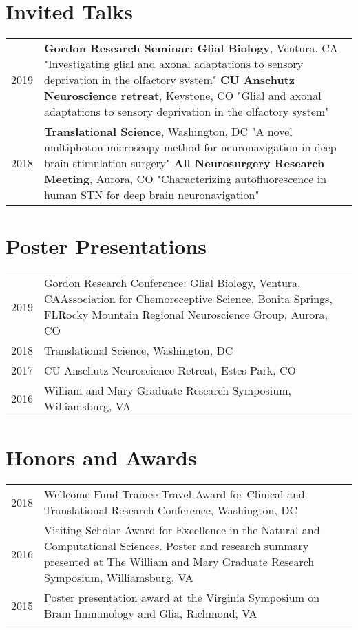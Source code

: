\documentclass[11pt]{article}
\begin{document}
\section*{Invited Talks}
\label{sec:org18bde68}
\begin{tabular}{lp{}}

2019& \textbf{Gordon Research Seminar: Glial Biology}, Ventura, CA \newline "Investigating glial and axonal adaptations to sensory deprivation in the olfactory system"\newline
\textbf{CU Anschutz Neuroscience retreat}, Keystone, CO \newline "Glial and axonal adaptations to sensory deprivation in the olfactory system" \\
2018& \textbf{Translational Science}, Washington, DC \newline "A novel multiphoton microscopy method for neuronavigation in deep brain stimulation surgery"
 \newline \textbf{All Neurosurgery Research Meeting}, Aurora, CO \newline "Characterizing autofluorescence in human STN for deep brain neuronavigation"\\
\end{tabular}
\section*{Poster Presentations}
\label{sec:org87837cd}
\begin{tabular}{lp{}}
2019& Gordon Research Conference: Glial Biology, Ventura, CA\newline Association for Chemoreceptive Science, Bonita Springs, FL\newline Rocky Mountain Regional Neuroscience Group, Aurora, CO\\
2018& Translational Science, Washington, DC\\
2017& CU Anschutz Neuroscience Retreat, Estes Park, CO\\
2016& William and Mary Graduate Research Symposium, Williamsburg, VA
\end{tabular}
\section*{Honors and Awards}
\label{sec:org3c2a441}
\begin{tabular}{lp{}}
2018& Wellcome Fund Trainee Travel Award for Clinical and Translational Research Conference, Washington, DC\\
2016& Visiting Scholar Award for Excellence in the Natural and Computational Sciences. Poster and research summary presented at The William and Mary Graduate Research Symposium, Williamsburg, VA \\
2015& Poster presentation award at the Virginia Symposium on Brain Immunology and Glia, Richmond, VA
\end{tabular}
\end{document}
